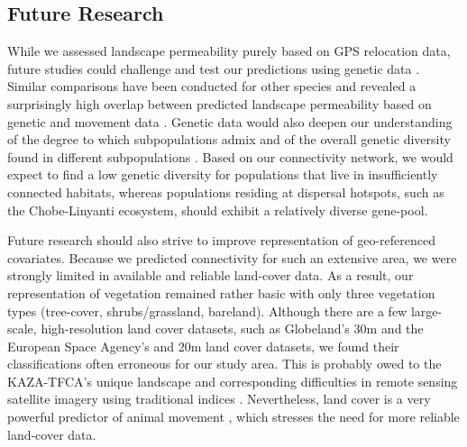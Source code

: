 \documentclass[abstract=on,10pt,a4paper,bibliography=totocnumbered]{scrartcl}
\begin{document}
\subsection{Future Research}
While we assessed landscape permeability purely based on GPS relocation
data, future studies could challenge and test our predictions using genetic data
\citep{Spear.2010}. Similar comparisons have been conducted for other species
and revealed a surprisingly high overlap between predicted landscape
permeability based on genetic and movement data \citep{Cushman.2010}. Genetic
data would also deepen our understanding of the degree to which subpopulations
admix and of the overall genetic diversity found in different subpopulations
\citep{Girman.2001}. Based on our connectivity network, we would expect to find
a low genetic diversity for populations that live in insufficiently connected
habitats, whereas populations residing at dispersal hotspots, such as the
Chobe-Linyanti ecosystem, should exhibit a relatively diverse gene-pool.

Future research should also strive to improve representation of geo-referenced
covariates. Because we predicted connectivity for such an extensive area, we
were strongly limited in available and reliable land-cover data. As a result,
our representation of vegetation remained rather basic with only three
vegetation types (tree-cover, shrubs/grassland, bareland). Although there are a
few large-scale, high-resolution land cover datasets, such as Globeland's 30m
\citep{Chen.2015} and the European Space Agency's and 20m \citep{ESA.2019} land
cover datasets, we found their classifications often erroneous for our study
area. This is probably owed to the KAZA-TFCA's unique landscape and
corresponding difficulties in remote sensing satellite imagery using traditional
indices \citep{Wolski.2017}. Nevertheless, land cover is a very powerful
predictor of animal movement \citep{Thurfjell.2014}, which stresses the need for
more reliable land-cover data.
\end{document}
